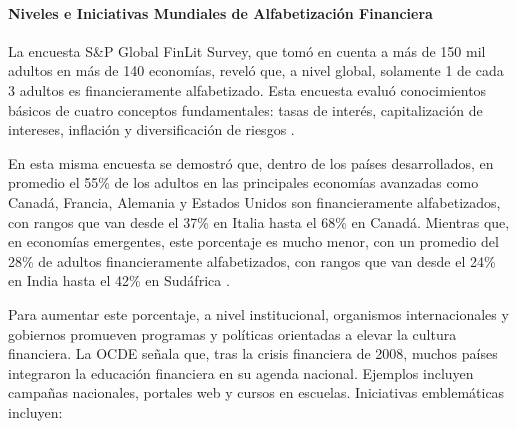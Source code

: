 \paragraph*{Niveles e Iniciativas Mundiales de Alfabetización Financiera}

La encuesta S\&P Global FinLit Survey, que tomó en cuenta a más de 150 mil adultos en más de 140 economías, reveló que, a nivel global, solamente 1 de cada 3 adultos es financieramente alfabetizado. Esta encuesta evaluó conocimientos básicos de cuatro conceptos fundamentales: tasas de interés, capitalización de intereses, inflación y diversificación de riesgos \parencite[p. 21]{FinLit01}.

En esta misma encuesta se demostró que, dentro de los países desarrollados, en promedio el 55\% de los adultos en las principales economías avanzadas como Canadá, Francia, Alemania y Estados Unidos son financieramente alfabetizados, con rangos que van desde el 37\% en Italia hasta el 68\% en Canadá. Mientras que, en economías emergentes, este porcentaje es mucho menor, con un promedio del 28\% de adultos financieramente alfabetizados, con rangos que van desde el 24\% en India hasta el 42\% en Sudáfrica \parencite[p. 23-25]{FinLit01}. 

Para aumentar este porcentaje, a nivel institucional, organismos internacionales y gobiernos promueven programas y políticas orientadas a elevar la cultura financiera. La OCDE señala que, tras la crisis financiera de 2008, muchos países integraron la educación financiera en su agenda nacional. Ejemplos incluyen campañas nacionales, portales web y cursos en escuelas. Iniciativas emblemáticas incluyen:


